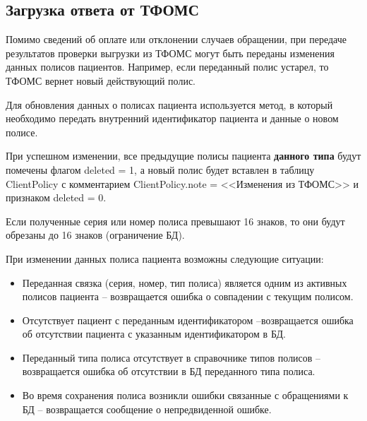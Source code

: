 \subsection{Загрузка ответа от ТФОМС}

Помимо сведений об оплате или отклонении случаев обращении, при передаче результатов проверки выгрузки из ТФОМС могут быть переданы изменения данных полисов пациентов. Например, если переданный полис устарел, то ТФОМС вернет новый действующий полис.

Для обновления данных о полисах пациента используется метод, в который необходимо передать внутренний идентификатор пациента и данные о новом полисе.

При успешном изменении, все предыдущие полисы пациента \textbf{данного типа} будут помечены флагом deleted = 1, а новый полис будет вставлен в таблицу ClientPolicy с комментарием ClientPolicy.note = <<Изменения из ТФОМС>> и признаком deleted = 0.

Если полученные серия или номер полиса превышают 16 знаков, то они будут обрезаны до 16 знаков (ограничение БД).

При изменении данных полиса пациента возможны следующие ситуации:
\begin{itemize}
 \item Переданная связка (серия, номер, тип полиса) является одним из активных полисов пациента – возвращается ошибка о совпадении с текущим полисом.
 \item Отсутствует пациент с переданным идентификатором –возвращается ошибка об отсутствии пациента с указанным идентификатором в БД.
 \item Переданный типа полиса отсутствует в справочнике типов полисов – возвращается ошибка об отсутствии в БД переданного типа полиса.
 \item Во время сохранения полиса возникли ошибки связанные с обращениями к БД – возвращается сообщение о непредвиденной ошибке.
\end{itemize}
